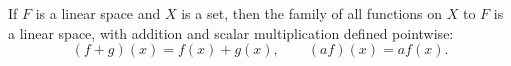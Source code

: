 If $F$ is a linear space and $X$ is a set, then the family of all functions on $X$ to $F$ is a linear space, with addition and scalar multiplication defined pointwise:
$$
(f + g)(x) = f(x) + g(x), \qquad (a f)(x) = a f(x).
$$
